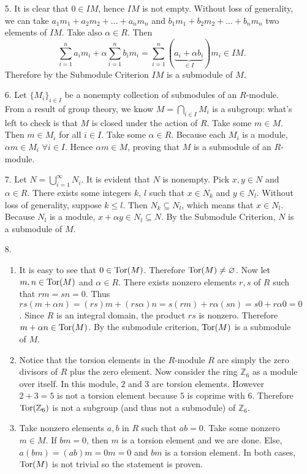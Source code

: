 \begin{enumerate}
\item[5.]
It is clear that $0\in IM$, hence $IM$ is not empty. Without loss of generality, we can take $a_1m_1+a_2m_2+\dots+a_nm_n$ and $b_1m_1+b_2m_2+\dots+b_nm_n$ two elements of $IM$. Take also $\alpha\in R$. Then
\begin{equation*}
\sum_{i=1}^na_im_i+\alpha\sum_{i=1}^nb_im_i = \sum_{i=1}^n(\underbrace{a_i+\alpha b_i}_{\in I})m_i \in IM.
\end{equation*}
Therefore by the Submodule Criterion $IM$ is a submodule of $M$.

\item[6.]
Let $\{M_i\}_{i\in I}$ be a nonempty collection of submodules of an $R$-module. From a result of group theory, we know $M=\bigcap_{i\in I}M_i$ is a subgroup: what's left to check is that $M$ is closed under the action of $R$. Take some $m\in M$. Then $m\in M_i$ for all $i\in I$. Take some $\alpha\in R$. Because each $M_i$ is a module, $\alpha m\in M_i$ $\forall i\in I$. Hence $\alpha m\in M$, proving that $M$ is a submodule of an $R$-module.

\item[7.]
Let $N=\bigcup_{i=1}^\infty N_i$. It is evident that $N$ is nonempty. Pick $x,y\in N$ and $\alpha\in R$. There exists some integers $k$, $l$ such that $x\in N_k$ and $y\in N_l$. Without loss of generality, suppose $k\leq l$. Then $N_k\subseteq N_l$, which means that $x\in N_l$. Because $N_l$ is a module, $x+\alpha y\in N_l\subseteq N$. By the Submodule Criterion, $N$ is a submodule of $M$.

\item[8.]
\begin{enumerate}
\item
It is easy to see that $0 \in \operatorname{Tor}(M)$. Therefore $\operatorname{Tor}(M) \neq \varnothing$. Now let $m,n \in \operatorname{Tor}(M)$ and $\alpha \in R$. There exists nonzero elements $r,s$ of $R$ such that $rm=sn=0$. Thus $rs(m+\alpha n) = (rs)m+(rs\alpha)n = s(rm)+r\alpha(sn) = s0+r\alpha0 = 0$. Since $R$ is an integral domain, the product $rs$ is nonzero. Therefore $m+\alpha n \in \operatorname{Tor}(M)$. By the submodule criterion, $\operatorname{Tor}(M)$ is a submodule of $M$.
\item
Notice that the torsion elements in the $R$-module $R$ are simply the zero divisors of $R$ plus the zero element. Now consider the ring $\mathbb{Z}_6$ as a module over itself. In this module, $2$ and $3$ are torsion elements. However $2+3=5$ is not a torsion element because $5$ is coprime with $6$. Therefore $\operatorname{Tor}(\mathbb{Z}_6)$ is not a subgroup (and thus not a submodule) of $\mathbb{Z}_6$.
\item
Take nonzero elements $a,b$ in $R$ such that $ab=0$. Take some nonzero $m\in M$. If $bm=0$, then $m$ is a torsion element and we are done. Else, $a(bm) = (ab)m = 0m=0$ and $bm$ is a torsion element. In both cases, $\operatorname{Tor}(M)$ is not trivial so the statement is proven.
\end{enumerate}


\end{enumerate}
